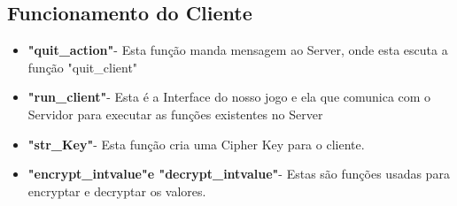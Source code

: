 \documentclass{report}
\begin{document}
\noindent

\subsection{Funcionamento do Cliente}
\begin{itemize}
    \item \textbf{"quit\_action"}\space- Esta função manda mensagem ao Server, onde esta escuta a função "quit\_client"
    \item \textbf{"run\_client"}\space- Esta é a Interface do nosso jogo e ela que comunica com o Servidor para executar as funções existentes no Server
    \item \textbf{"str\_Key"}\space- Esta função cria uma Cipher Key para o cliente.
    \item \textbf{"encrypt\_intvalue"\space e "decrypt\_intvalue"}\space- Estas são funções usadas para encryptar e decryptar os valores.
\end{itemize}
\noindent
\end{document}
